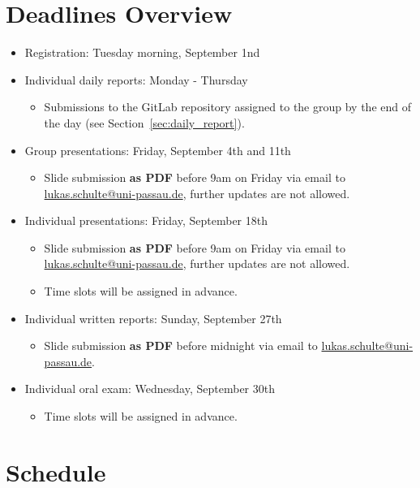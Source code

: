 \documentclass{article}
\begin{document}
\section{Deadlines Overview}

\begin{itemize}
    \item Registration: Tuesday morning, September 1nd
    \item Individual daily reports: Monday - Thursday
    \begin{itemize}
        \item Submissions to the GitLab repository assigned to the group by the end of the day (see Section~\ref{sec:daily_report}).
    \end{itemize}
    \item Group presentations: Friday, September 4th and 11th
    \begin{itemize}
        \item Slide submission \textbf{as PDF} before 9am on Friday via email to \url{lukas.schulte@uni-passau.de}, further updates are not allowed.
    \end{itemize}
    \item Individual presentations: Friday, September 18th
    \begin{itemize}
        \item Slide submission \textbf{as PDF} before 9am on Friday via email to \url{lukas.schulte@uni-passau.de}, further updates are not allowed.
        \item Time slots will be assigned in advance.
    \end{itemize}
    \item Individual written reports: Sunday, September 27th
    \begin{itemize}
        \item Slide submission \textbf{as PDF} before midnight via email to \url{lukas.schulte@uni-passau.de}.
    \end{itemize}
    \item Individual oral exam: Wednesday, September 30th
    \begin{itemize}
        \item Time slots will be assigned in advance.
    \end{itemize}
    
\end{itemize}

\section{Schedule}
\end{document}
